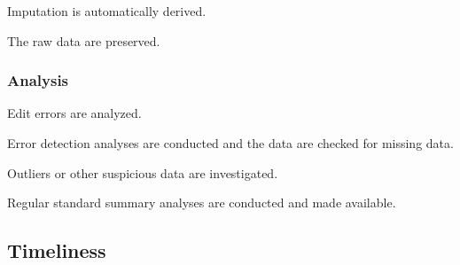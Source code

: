 \begin{QandA}
    \item Imputation is automatically derived.
    \begin{answered}
        
    \end{answered}

    \item The raw data are preserved.
    \begin{answered}
        
    \end{answered}

\end{QandA}

\subsubsection{Analysis}

\begin{QandA}
    \item Edit errors are analyzed.
    \begin{answered}
        
    \end{answered}

    \item Error detection analyses are conducted and the data are checked for missing data.
    \begin{answered}
        
    \end{answered}

    \item Outliers or other suspicious data are investigated.
    \begin{answered}
        
    \end{answered}

    \item Regular standard summary analyses are conducted and made available.
    \begin{answered}
        
    \end{answered}

\end{QandA}

\subsection{Timeliness}

